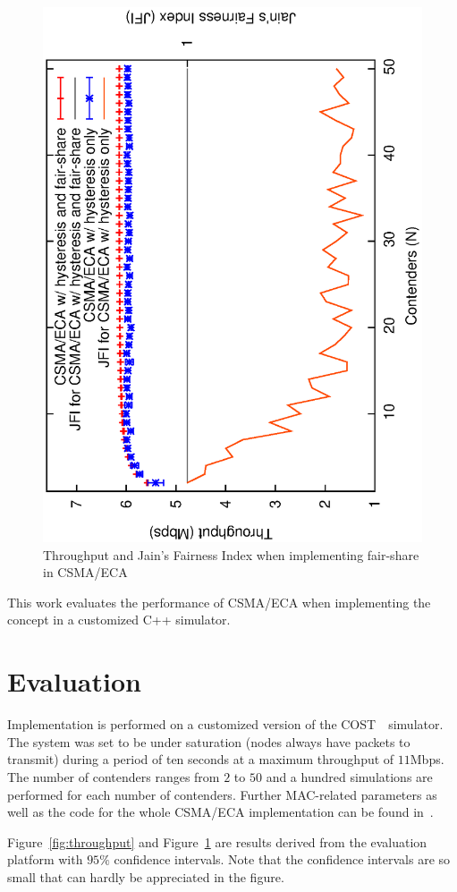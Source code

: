 \begin{figure}[htbp]
  \centering
  \includegraphics[width=0.7\linewidth, angle = -90]{figures/errorPlots/ECA-w-enhancements-NEW.eps}
  \caption{Throughput and Jain's Fairness Index when implementing fair-share in CSMA/ECA
  \label{fig:fairShare}}
\end{figure}

This work evaluates the performance of CSMA/ECA when implementing the concept in a customized C++ simulator.

\section{Evaluation}

Implementation is performed on a customized version of the COST~\cite{COST}~simulator. The system was set to be under saturation (nodes always have packets to transmit) during a period of ten seconds at a maximum throughput of $11$Mbps. The number of contenders ranges from $2$ to $50$ and a hundred simulations are performed for each number of contenders. Further MAC-related parameters as well as the code for the whole CSMA/ECA implementation can be found in~\cite{sim:parameters}.

Figure~\ref{fig:throughput} and Figure~\ref{fig:fairShare} are results derived from the evaluation platform with $95\%$ confidence intervals. Note that the confidence intervals are so small that can hardly be appreciated in the figure.